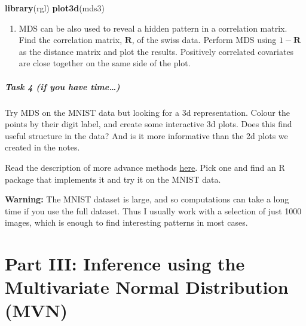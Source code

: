 \documentclass[
]{book}
\newenvironment{Shaded}{\begin{snugshade}}{\end{snugshade}}
\newcommand{\FunctionTok}[1]{\textcolor[rgb]{0.13,0.29,0.53}{\textbf{#1}}}
\newcommand{\NormalTok}[1]{#1}
\providecommand{\tightlist}{%
  \setlength{\itemsep}{0pt}\setlength{\parskip}{0pt}}
\theoremstyle{definition}
\theoremstyle{definition}
\theoremstyle{definition}
\theoremstyle{definition}
\theoremstyle{remark}
\begin{document}
\begin{Shaded}
\begin{Highlighting}[]
\FunctionTok{library}\NormalTok{(rgl)}
\FunctionTok{plot3d}\NormalTok{(mds3)}
\end{Highlighting}
\end{Shaded}

\begin{enumerate}
\def\labelenumi{\roman{enumi}.}
\setcounter{enumi}{2}
\tightlist
\item
  MDS can be also used to reveal a hidden pattern in a correlation matrix. Find the correlation matrix, \(\mathbf R\), of the swiss data. Perform MDS using \(1-\mathbf R\) as the distance matrix and plot the results. Positively correlated covariates are close together on the same side of the plot.
\end{enumerate}

\hypertarget{task-4-if-you-have-time}{%
\paragraph*{Task 4 (if you have time\ldots)}\label{task-4-if-you-have-time}}

Try MDS on the MNIST data but looking for a 3d representation. Colour the points by their digit label, and create some interactive 3d plots. Does this find useful structure in the data? And is it more informative than the 2d plots we created in the notes.

Read the description of more advance methods \href{https://colah.github.io/posts/2014-10-Visualizing-MNIST/}{here}. Pick one and find an R package that implements it and try it on the MNIST data.

\textbf{Warning:} The MNIST dataset is large, and so computations can take a long time if you use the full dataset. Thus I usually work with a selection of just 1000 images, which is enough to find interesting patterns in most cases.

\hypertarget{part-iii-inference-using-the-multivariate-normal-distribution-mvn}{%
\chapter*{Part III: Inference using the Multivariate Normal Distribution (MVN)}\label{part-iii-inference-using-the-multivariate-normal-distribution-mvn}}
\end{document}
